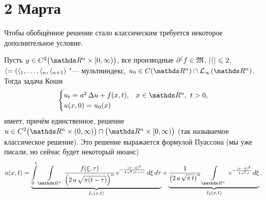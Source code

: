 \section{2 Марта}
Чтобы обобщённое решение стало классическим требуется некоторое дополнительное условие.
\begin{The}
  Пусть $g\in C^2\big(\R^n\times[0,\infty)\big)$, все производные $\partial^\langle f\in\mathfrak M$, $|\langle|\leqslant 2$, $\langle = (\langle_1,\dots,\langle_n,\langle_{n+1})$ "--- мультииндекс, $u_0\in C(\R^n)\cap\L_\infty(\R^n)$. Тогда задача Коши
\begin{equation}\label{LapKo}
\begin{cases}
u_t = a^2\,\Delta u + f(x,t),&x\in\R^n,\ t>0,\\
u(x,0) = u_0(x)
\end{cases}
\end{equation}
имеет, причём единственное, решение $u\in C^2\big(\R^n\times(0,\infty)\big)\cap\big(\R^n\times[0,\infty)\big)$ (так называемое классическое решение). Это решение выражается формулой Пуассона (мы уже писали, но сейчас будет некоторый нюанс)
\begin{equation}\label{LapKo2}
  u(x,t) = 
    \underbrace{
\int\limits_0^t\Gint{\R^n}\frac{f(\xi,\tau)}{\left(2\,a\,\sqrt{\pi(t-\tau)}\right)^n}\,e^{-\frac{|x-\xi|^2}{4\,a^2\,(t-\tau)}}\,d\xi\,d\tau
}_{I_1(x,t)} + 
    \underbrace{\frac1{\left(2\,a\,\sqrt{\pi\,t}\right)^n}\Gint{\R^n}\,e^{-\frac{|x-\xi|^2}{4\,a^2\,t}}\,d\xi}_{I_2(x,t)}.
\end{equation}
\end{The}
